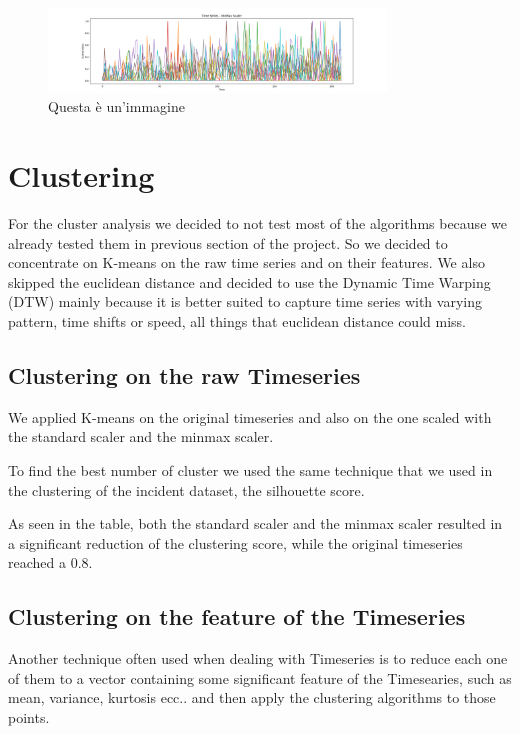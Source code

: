 \begin{figure}[ht]
    \centering
    \includegraphics[width= 0.8\textwidth]{images/Capitolo1/time_series_minmax_scaler.png} 
    \caption{Questa è un'immagine} 
    \label{fig:time_series_minmax_scaler}
\end{figure}


\section{Clustering}

For the cluster analysis we decided to not test most of the algorithms because we already tested them in previous section of the project.
So we decided to concentrate on K-means on the raw time series and on their features.
We also skipped the euclidean distance and decided to use the Dynamic Time Warping (DTW) mainly because it is better suited to capture time series with varying pattern, time shifts or speed, all things that euclidean distance could miss.


\subsection{Clustering on the raw Timeseries}

We applied K-means on the original timeseries and also on the one scaled with the standard scaler and the minmax scaler.

To find the best number of cluster we used the same technique that we used in the clustering of the incident dataset, the silhouette score.

As seen in the table, both the standard scaler and the minmax scaler resulted in a significant reduction of the clustering score, while the original timeseries reached a 0.8. 


\subsection{Clustering on the feature of the Timeseries}

Another technique often used when dealing with Timeseries is to reduce each one of them to a vector containing some significant feature of the Timesearies, such as mean, variance, kurtosis ecc..  and then apply the clustering algorithms to those points.

